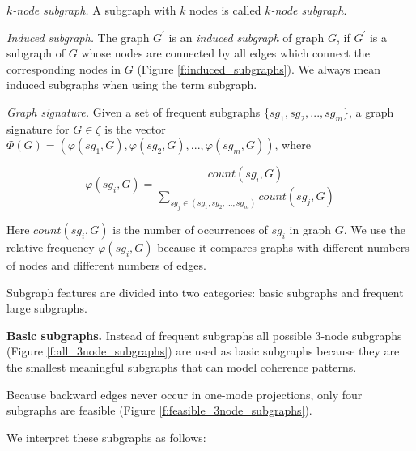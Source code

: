 $\mathit{k}$\textit{-node subgraph.} A subgraph with $k$ nodes is called $\mathit{k}$\textit{-node subgraph}.

\textit{Induced subgraph.} The graph $G^\prime$ is an \textit{induced subgraph} of graph $G$, if $G^\prime$ is a subgraph of $G$ whose
nodes are connected by all edges which connect the corresponding nodes in $G$
(Figure \ref{f:induced_subgraphs}). 
We always mean induced subgraphs when using the term subgraph.  
    
%

\textit{Graph signature.} Given a set of frequent subgraphs $\lbrace sg_1, sg_2,...,sg_m\rbrace$, a graph signature for $G\in\zeta$ is the
vector $\Phi(G)=\left(\varphi(sg_1, G), \varphi(sg_2, G),..., \varphi(sg_m, G)\right)$, where \vspace*{1.0 ex}
\begin{small}
\begin{equation*}
 \varphi(sg_i, G)= \frac{count(sg_i, G)}{\sum_{sg_j \in (sg_1, sg_2,...,sg_m)}{count(sg_j, G)}}
\end{equation*}
\end{small}
Here $count(sg_i, G)$ is the number of occurrences of $sg_i$ in graph $G$. 
We use the relative frequency $\varphi(sg_i, G)$ because it compares graphs with different numbers of nodes and
different numbers of edges. 

Subgraph features are divided into two categories: basic subgraphs and frequent large subgraphs.

\textbf{Basic subgraphs.} Instead of frequent subgraphs all possible 3-node subgraphs (Figure \ref{f:all_3node_subgraphs}) are used as
basic subgraphs because they are the smallest meaningful subgraphs that can model coherence patterns. 

Because backward edges never occur in one-mode projections, only four subgraphs are feasible (Figure \ref{f:feasible_3node_subgraphs}).

%

We interpret these subgraphs as follows:

